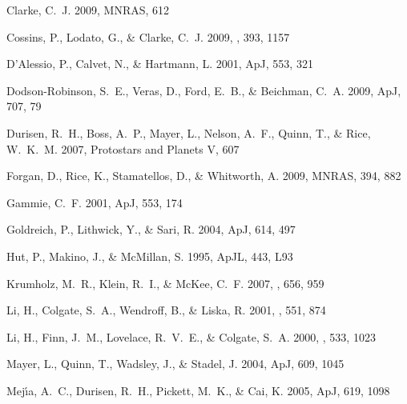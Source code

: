 \documentclass[12pt,manuscript,authoryear]{aastex}
\begin{document}
\begin{thebibliography}{48}
{Clarke}, C.~J. 2009, MNRAS, 612

{Cossins}, P., {Lodato}, G., \& {Clarke}, C.~J. 2009, \mnras, 393, 1157

{D'Alessio}, P., {Calvet}, N., \& {Hartmann}, L. 2001, ApJ, 553, 321

{Dodson-Robinson}, S.~E., {Veras}, D., {Ford}, E.~B., \& {Beichman}, C.~A.
  2009, ApJ, 707, 79

{Durisen}, R.~H., {Boss}, A.~P., {Mayer}, L., {Nelson}, A.~F., {Quinn}, T., \&
  {Rice}, W.~K.~M. 2007, Protostars and Planets V, 607

{Forgan}, D., {Rice}, K., {Stamatellos}, D., \& {Whitworth}, A. 2009, MNRAS,
  394, 882

{Gammie}, C.~F. 2001, ApJ, 553, 174

{Goldreich}, P., {Lithwick}, Y., \& {Sari}, R. 2004, ApJ, 614, 497

{Hut}, P., {Makino}, J., \& {McMillan}, S. 1995, ApJL, 443, L93

{Krumholz}, M.~R., {Klein}, R.~I., \& {McKee}, C.~F. 2007, \apj, 656, 959

{Li}, H., {Colgate}, S.~A., {Wendroff}, B., \& {Liska}, R. 2001, \apj, 551, 874

{Li}, H., {Finn}, J.~M., {Lovelace}, R.~V.~E., \& {Colgate}, S.~A. 2000, \apj,
  533, 1023

{Mayer}, L., {Quinn}, T., {Wadsley}, J., \& {Stadel}, J. 2004, ApJ, 609, 1045

{Mej{\'{\i}}a}, A.~C., {Durisen}, R.~H., {Pickett}, M.~K., \& {Cai}, K. 2005,
  ApJ, 619, 1098


\end{thebibliography}
\end{document}
